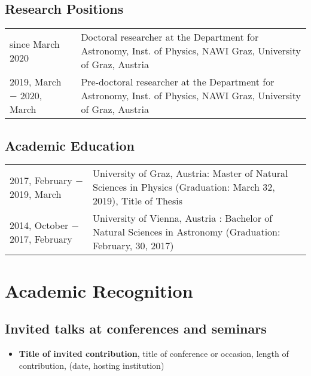 \subsection*{Research Positions}
\begin{longtable}{p{}p{}}
    {since March 2020}  & 
    Doctoral researcher at the 
	Department for Astronomy, Inst. of Physics, NAWI Graz, University of Graz, Austria \\[0.5em]
    
    {2019, March  \newline $-$ 2020, March }  & 
    Pre-doctoral researcher at the 
	Department for Astronomy, Inst. of Physics, NAWI Graz, University of Graz, Austria \\[0.5em]


\end{longtable}


\subsection*{Academic Education}
\begin{longtable}{p{}p{}}

    {2017, February \newline $-$ 2019, March}  &	University of Graz, Austria: Master of Natural Sciences in Physics (Graduation: March 32, 2019), Title of Thesis\\[0.5em]
    
    {2014, October \newline $-$ 2017, February}  &	University of Vienna, Austria : Bachelor of Natural Sciences in Astronomy (Graduation: February, 30, 2017)\\[0.5em]

\end{longtable}
\clearpage

\section*{Academic Recognition}

\subsection*{Invited talks at conferences and seminars}
\begin{itemize}
    
    \item \textbf{Title of invited contribution}, title of conference or occasion, length of contribution, (date, hosting institution)
    
    
    
\end{itemize}


